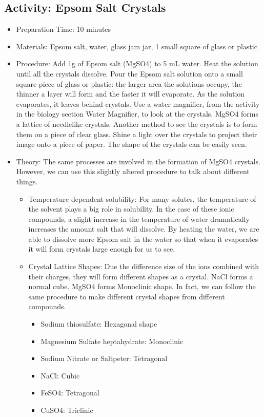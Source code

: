 \begin{itemize}
{\begin{itemize}
\subsection{Activity: Epsom Salt Crystals}
\begin{itemize}
\item{Preparation Time: 10 minutes}
\item{Materials: Epsom salt, water, glass jam jar, 1 small square of glass or plastic}
\item{Procedure: Add 1g of Epsom salt (MgSO4) to 5 mL water. Heat the solution until all the crystals dissolve. Pour the Epsom salt solution onto a small square piece of glass or plastic: the larger area the solutions occupy, the thinner a layer will form and the faster it will evaporate. As the solution evaporates, it leaves behind crystals. Use a water magnifier, from the activity in the biology section Water Magnifier, to look at the crystals. MgSO4 forms a lattice of needlelike crystals. Another method to see the crystals is to form them on a piece of clear glass. Shine a light over the crystals to project their image onto a piece of paper. The shape of the crystals can be easily seen. }
\item{Theory: The same processes are involved in the formation of MgSO4 crystals. However, we can use this slightly altered procedure to talk about different things.
\begin{itemize}
\item{Temperature dependent solubility: For many solutes, the temperature of the solvent plays a big role in solubility. In the case of these ionic compounds, a slight increase in the temperature of water dramatically increases the amount salt that will dissolve. By heating the water, we are able to dissolve more Epsom salt in the water so that when it evaporates it will form crystals large enough for us to see.}
\item{Crystal Lattice Shapes: Due the difference size of the ions combined with their charges, they will form different shapes as a crystal. NaCl forms a normal cube. MgSO4 forms Monoclinic shape. In fact, we can follow the same procedure to make different crystal shapes from different compounds. 
\begin{itemize}
\item{Sodium thiosulfate: Hexagonal shape}
\item{Magnesium Sulfate heptahydrate: Monoclinic}
\item{Sodium Nitrate or Saltpeter: Tetragonal}
\item{NaCl: Cubic}
\item{FeSO4: Tetragonal}
\item{CuSO4: Triclinic}
\end{itemize}
} %
\end{itemize}
} %
\end{itemize}


\end{itemize}}
\end{itemize}
